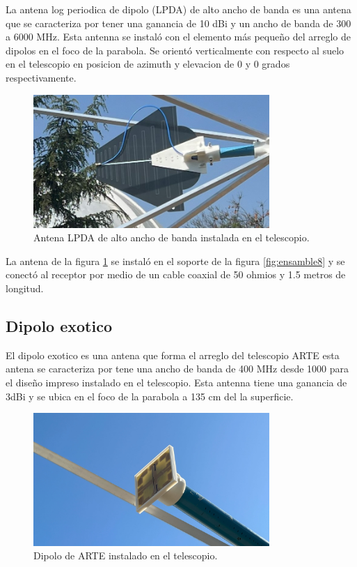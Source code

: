 La antena log periodica de dipolo (LPDA) de alto ancho de banda es una antena que se caracteriza por tener una ganancia de 10 dBi y un ancho de banda de 300 a 6000 MHz. Esta antenna se instaló con el elemento más pequeño del arreglo de dipolos en el foco de la parabola. Se orientó verticalmente con respecto al suelo en el telescopio en posicion de azimuth y elevacion de 0 y 0 grados respectivamente.\\

\begin{figure}
    \centering
    \includegraphics[width=0.8\textwidth]{img/lpda}
    \caption{Antena LPDA de alto ancho de banda instalada en el telescopio.}
    \label{fig:ensamble13}
\end{figure}

La antena de la figura \ref{fig:ensamble13} se instaló en el soporte de la figura \ref{fig:ensamble8} y se conectó al receptor por medio de un cable coaxial de 50 ohmios y 1.5 metros de longitud.\\

\subsection{Dipolo exotico}

El dipolo exotico es una antena que forma el arreglo del telescopio ARTE\cite{Gallardo2023} esta antena se caracteriza por tene una ancho de banda de 400 MHz desde 1000 para el diseño impreso instalado en el telescopio. Esta antenna tiene una ganancia de 3dBi y se ubica en el foco de la parabola a 135 cm del la superficie.\\

\begin{figure}
    \centering
    \includegraphics[width=0.8\textwidth]{img/feed}
    \caption{Dipolo de ARTE instalado en el telescopio.}
    \label{fig:ensamble14}
\end{figure}

